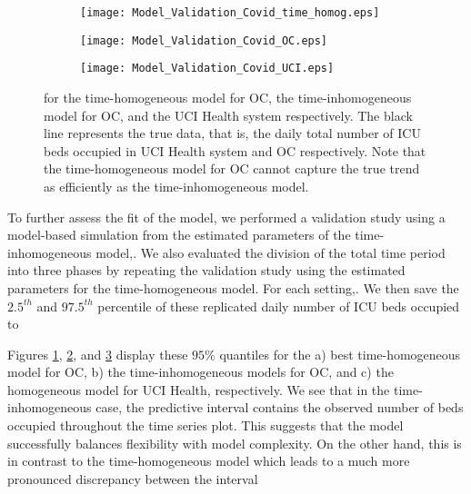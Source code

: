 \documentclass{article}
\newcommand{\achal}[1]{{\color{black}{ #1}}}
\begin{document}
\begin{figure}[h]
\centering
\begin{subfigure}{.49\textwidth}
  \texttt{[image: Model\_Validation\_Covid\_time\_homog.eps]}
  \vspace{-0.2cm}
  \caption{}
  \label{fig6:sub-first}
 \end{subfigure}
\begin{subfigure}{.49\textwidth}
  \texttt{[image: Model\_Validation\_Covid\_OC.eps]}
  \vspace{-0.2cm}
  \caption{}
  \label{fig6:sub-second}
\end{subfigure}
\begin{subfigure}{.49\textwidth}
  \texttt{[image: Model\_Validation\_Covid\_UCI.eps]}
  \vspace{-0.2cm}
  \caption{}
  \label{fig6:sub-third}
\end{subfigure} 

\caption{\achal{Middle $95\%$ pointwise quantiles of the replicated datasets generated from the best model} for the time-homogeneous model for OC, the time-inhomogeneous model for OC, and the UCI Health system respectively. The black line represents the true data, that is, the daily total number of ICU beds occupied in UCI Health system and OC respectively. Note that the time-homogeneous model for OC cannot capture the true trend as efficiently as the time-inhomogeneous model.}
\label{fig6}
\end{figure}

To further assess the fit of the model, we performed a validation study using a model-based simulation from the estimated parameters of the time-inhomogeneous model,\achal{with the goal being to check and visualize how well our model was able to capture the various aspects of the observed data}. We also evaluated the division of the total time period into three phases by repeating the validation study using the estimated parameters for the time-homogeneous model. For each setting,\achal{we generate 100 replicate datasets consisting of the number of ICU beds occupied conditional on the hospital bed counts}. We then save the $2.5^{th}$ and $97.5^{th}$ percentile of these replicated daily number of ICU beds occupied to\achal{create pointwise middle $95\%$ quantiles generated from these replicated datasets.} \par

Figures \ref{fig6:sub-first}, \ref{fig6:sub-second}, and \ref{fig6:sub-third} display these $95\%$ quantiles for the a) best time-homogeneous model for OC, b) the time-inhomogeneous models for OC, and c) the homogeneous model for UCI Health, respectively. We see that in the time-inhomogeneous case, the predictive interval contains the observed number of beds occupied throughout the time series plot. This suggests that the model successfully balances flexibility with model complexity. On the other hand, this is in contrast to the time-homogeneous model which leads to a much more pronounced discrepancy between the interval\achal{generated from replicated datasets and the observed counts.}
\end{document}
